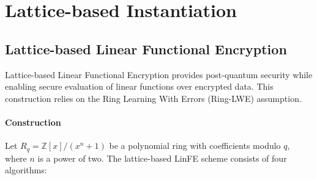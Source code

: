 \section{Lattice-based Instantiation}
\subsection{Lattice-based Linear Functional Encryption}\label{Appendix:Lattice-LinFE}

Lattice-based Linear Functional Encryption provides post-quantum security while enabling secure evaluation of linear functions over encrypted data. This construction relies on the Ring Learning With Errors (Ring-LWE) assumption.

\paragraph{Construction}
Let $R_q = \mathbb{Z}[x]/(x^n+1)$ be a polynomial ring with coefficients modulo $q$, where $n$ is a power of two. The lattice-based LinFE scheme consists of four algorithms:

